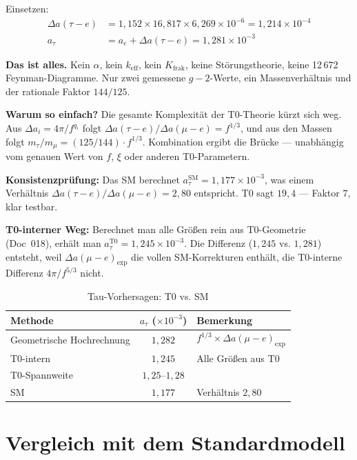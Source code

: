Einsetzen:
\begin{align}
	\Delta a(\tau{-}e) &= 1{,}152 \times 16{,}817 \times 6{,}269 \times 10^{-6} = 1{,}214 \times 10^{-4} \\
	a_\tau &= a_e + \Delta a(\tau{-}e) = \boxed{1{,}281 \times 10^{-3}}
	\label{eq:taupred}
\end{align}

\textbf{Das ist alles.} Kein $\alpha$, kein $k_\text{eff}$, kein $K_\text{frak}$, keine Störungstheorie, keine 12\,672 Feynman-Diagramme. Nur zwei gemessene $g-2$-Werte, ein Massenverhältnis und der rationale Faktor $144/125$.

\textbf{Warum so einfach?} Die gesamte Komplexität der T0-Theorie kürzt sich weg. Aus $\Delta a_i = 4\pi/f^{q_i}$ folgt $\Delta a(\tau{-}e)/\Delta a(\mu{-}e) = f^{1/3}$, und aus den Massen folgt $m_\tau/m_\mu = (125/144) \cdot f^{1/3}$. Kombination ergibt die Brücke — unabhängig vom genauen Wert von $f$, $\xi$ oder anderen T0-Parametern.

\textbf{Konsistenzprüfung:} Das SM berechnet $a_\tau^\text{SM} = 1{,}177 \times 10^{-3}$, was einem Verhältnis $\Delta a(\tau{-}e)/\Delta a(\mu{-}e) = 2{,}80$ entspricht. T0 sagt $19{,}4$ — Faktor $7$, klar testbar.

\textbf{T0-interner Weg:} Berechnet man alle Größen rein aus T0-Geometrie (Doc~018), erhält man $a_\tau^\text{T0} = 1{,}245 \times 10^{-3}$. Die Differenz ($1{,}245$ vs. $1{,}281$) entsteht, weil $\Delta a(\mu{-}e)_\text{exp}$ die vollen SM-Korrekturen enthält, die T0-interne Differenz $4\pi/f^{5/3}$ nicht.

\begin{table}[h]
	\centering
	\begin{tabular}{lcl}
		\toprule
		\textbf{Methode} & $a_\tau$ ($\times 10^{-3}$) & \textbf{Bemerkung} \\
		\midrule
		Geometrische Hochrechnung & $1{,}282$ & $f^{1/3} \times \Delta a(\mu{-}e)_\text{exp}$ \\
		T0-intern & $1{,}245$ & Alle Größen aus T0 \\
		T0-Spannweite & $1{,}25$--$1{,}28$ & \\
		\midrule
		SM & $1{,}177$ & Verhältnis $2{,}80$ \\
		\bottomrule
	\end{tabular}
	\caption{Tau-Vorhersagen: T0 vs. SM}
	\label{tab:taupred}
\end{table}

\section{Vergleich mit dem Standardmodell}
\label{sec:comparison}

